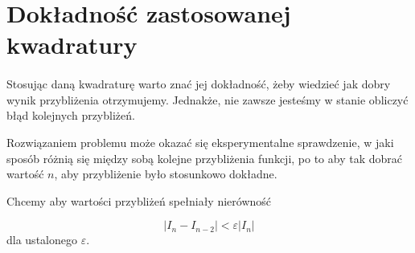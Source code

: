 \documentclass{article}
\begin{document}
  \section{Dokładność zastosowanej kwadratury}
    \paragraph{} Stosując daną kwadraturę warto znać jej dokładność, żeby wiedzieć
    jak dobry wynik przybliżenia otrzymujemy. Jednakże, nie zawsze jesteśmy w stanie
    obliczyć błąd kolejnych przybliżeń.

    Rozwiązaniem problemu może okazać się eksperymentalne sprawdzenie, w jaki sposób
    różnią się między sobą kolejne przybliżenia funkcji, po to aby tak dobrać wartość
    $n$, aby przybliżenie było stosunkowo dokładne.

    Chcemy aby wartości przybliżeń spełniały nierówność

    \begin{equation*}
        |I_n - I_{n-2}| < \varepsilon |I_{n}|
    \end{equation*}
    dla ustalonego $\varepsilon$.
\end{document}

